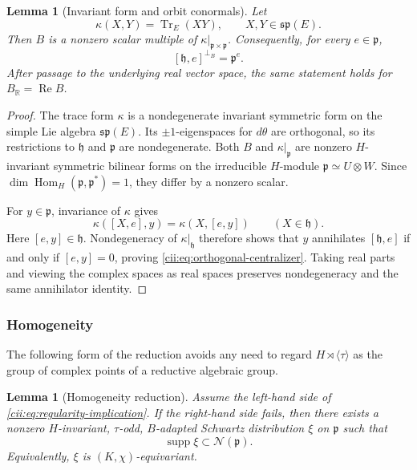 \documentclass[10pt,a4paper]{amsart}
\numberwithin{equation}{section}
\newtheorem{lemma}[theorem]{Lemma}
\newcommand{\R}{\mathbb R}
\newcommand{\Hom}{\operatorname{Hom}}
\newcommand{\Tr}{\operatorname{Tr}}
\newcommand{\supp}{\operatorname{supp}}
\newcommand{\cN}{\mathcal N}
\begin{document}
\begin{lemma}[Invariant form and orbit conormals]\label{cii:lem:B-centralizer}
Let
\[
  \kappa(X,Y)=\Tr_E(XY),\qquad X,Y\in\mathfrak{sp}(E).
\]
Then \(B\) is a nonzero scalar multiple of
\(\kappa|_{\mathfrak p\times\mathfrak p}\).  Consequently, for every
\(e\in\mathfrak p\),
\begin{equation}\label{cii:eq:orthogonal-centralizer}
  [\mathfrak h,e]^{\perp_B}=\mathfrak p^e.
\end{equation}
After passage to the underlying real vector space, the same statement holds
for \(B_{\R}=\operatorname{Re}B\).
\end{lemma}

\begin{proof}
The trace form \(\kappa\) is a nondegenerate invariant symmetric form on the
simple Lie algebra \(\mathfrak{sp}(E)\).  Its \(\pm1\)-eigenspaces for
\(d\theta\) are orthogonal, so its restrictions to \(\mathfrak h\) and
\(\mathfrak p\) are nondegenerate.  Both \(B\) and
\(\kappa|_{\mathfrak p}\) are nonzero \(H\)-invariant symmetric bilinear
forms on the irreducible \(H\)-module
\(\mathfrak p\simeq U\otimes W\).  Since
\(\dim\Hom_H(\mathfrak p,\mathfrak p^*)=1\), they differ by a nonzero
scalar.

For \(y\in\mathfrak p\), invariance of \(\kappa\) gives
\[
  \kappa([X,e],y)=\kappa(X,[e,y])\qquad(X\in\mathfrak h).
\]
Here \([e,y]\in\mathfrak h\).  Nondegeneracy of \(\kappa|_{\mathfrak h}\)
therefore shows that \(y\) annihilates \([\mathfrak h,e]\) if and only if
\([e,y]=0\), proving \eqref{cii:eq:orthogonal-centralizer}.  Taking real parts
and viewing the complex spaces as real spaces preserves nondegeneracy and the
same annihilator identity.
\end{proof}

\subsubsection{Homogeneity}

The following form of the reduction avoids any need to regard
\(H\rtimes\langle\tau\rangle\) as the group of complex points of a
reductive algebraic group.

\begin{lemma}[Homogeneity reduction]\label{cii:lem:homogeneity}
Assume the left-hand side of \eqref{cii:eq:regularity-implication}.  If the
right-hand side fails, then there exists a nonzero \(H\)-invariant,
\(\tau\)-odd, \(B\)-adapted Schwartz distribution \(\xi\) on
\(\mathfrak p\) such that
\[
\supp\xi\subset\cN(\mathfrak p).
\]
Equivalently, \(\xi\) is \((K,\chi)\)-equivariant.
\end{lemma}
\end{document}

